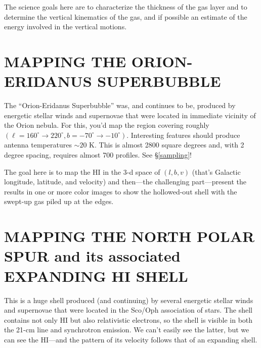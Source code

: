 \documentclass[preprint]{aastex}
\begin{document}
	The science goals here are to characterize the thickness of the
gas layer and to determine the vertical kinematics of the gas, and if
possible an estimate of the energy involved in the vertical motions.

%

\section{MAPPING THE ORION-ERIDANUS SUPERBUBBLE} \label{eridanus}

The ``Orion-Eridanus Superbubble'' was, and continues to be, produced by
energetic stellar winds and supernovae that were located in immediate
vicinity of the Orion nebula. For this, you'd map the region covering
roughly $(\ell=160^\circ \rightarrow 220^\circ, b=-70^\circ \rightarrow
-10^\circ)$. Interesting features should produce antenna temperatures
$\sim 20$ K. This is almost 2800 square degrees and, with 2 degree
spacing, requires almost 700 profiles. See \S \ref{sampling}!

The goal here is to map the HI in the 3-d space of $(l, b, v)$ (that's
Galactic longitude, latitude, and velocity) and then---the challenging
part---present the results in one or more color images to show the
hollowed-out shell with the swept-up gas piled up at the edges.

\section{MAPPING THE NORTH POLAR SPUR and its associated EXPANDING HI SHELL}

This is a huge shell produced (and continuing) by several energetic
stellar winds and supernovae that were located in the Sco/Oph
association of stars. The shell contains not only HI but also
relativistic electrons, so the shell is visible in both the 21-cm line
and synchrotron emission. We can't easily see the latter, but we can see
the HI---and the pattern of its velocity follows that of an expanding
shell.
\end{document}
